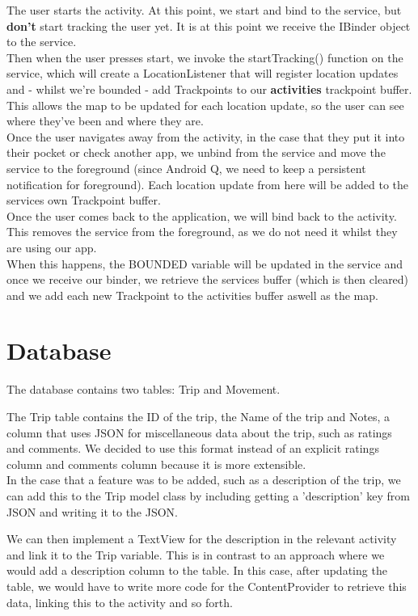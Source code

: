 \documentclass[11pt]{article}
\begin{document}
The user starts the activity. At this point, we start and bind to the service, but \textbf{don't} start tracking the user yet. It is at this point we receive the IBinder object to the service.\\ 

Then when the user presses start, we invoke the startTracking() function on the service, which will create a LocationListener that will register location updates and - whilst we're bounded - add Trackpoints to our \textbf{activities} trackpoint buffer. This allows the map to be updated for each location update, so the user can see where they've been and where they are. \\

Once the user navigates away from the activity, in the case that they put it into their pocket or check another app, we unbind from the service and move the service to the foreground (since Android Q, we need to keep a persistent notification for foreground). Each location update from here will be added to the services own Trackpoint buffer. \\ 

Once the user comes back to the application, we will bind back to the activity. This removes the service from the foreground, as we do not need it whilst they are using our app. \\
When this happens, the BOUNDED variable will be updated in the service and once we receive our binder, we retrieve the services buffer (which is then cleared) and we add each new Trackpoint to the activities buffer aswell as the map. \\


\section{Database}

The database contains two tables: Trip and Movement.

The Trip table contains the ID of the trip, the Name of the trip and Notes, a column that uses JSON for miscellaneous data about the trip, such as ratings and comments. We decided to use this format instead of an explicit ratings column and comments column because it is more extensible. \\
In the case that a feature was to be added, such as a description of the trip, we can add this to the Trip model class by including getting a 'description' key from JSON and writing it to the JSON. 

We can then implement a TextView for the description in the relevant activity and link it to the Trip variable. This is in contrast to an approach where we would add a description column to the table. In this case, after updating the table, we would have to write more code for the ContentProvider to retrieve this data, linking this to the activity and so forth.
\end{document}
